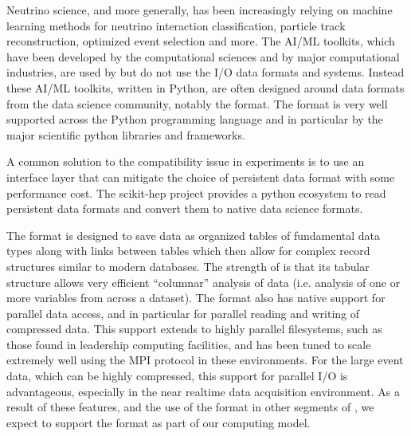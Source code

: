 \documentclass[../main-v1.tex]{subfiles}
\begin{document}
Neutrino science, and  more generally, has been increasingly relying on machine learning methods for neutrino interaction classification, particle track reconstruction, optimized event selection and more.  The AI/ML toolkits, which have been developed by the computational sciences and by major computational industries, are used by  but do not use 
the  I/O data formats and systems.
Instead these AI/ML toolkits, written in Python, are often designed around 
data formats from the data science community,
notably the  format.  The  format is very well supported across the Python programming language and in particular by the major scientific python libraries and frameworks.  

A common solution to the compatibility issue in  experiments is to use an interface layer that can mitigate the choice of persistent data format with some performance cost.  The scikit-hep project\cite{Rodrigues:2019nct} provides a python ecosystem to read  persistent data formats and convert them to native data science formats.

The  format is designed to save data as organized tables of fundamental data types along with links between tables which then allow for complex record structures similar to modern databases.  The strength of  is that its tabular structure allows very
efficient ``columnar'' analysis of data (i.e. analysis of one or more variables from across a dataset).
The format also has native support for parallel data access, and in particular for parallel reading and writing of compressed data.  This support extends to highly parallel filesystems, such as those found in leadership computing facilities, and has been tuned to scale extremely well using the MPI protocol in these environments.  
For the large  event data, which can be highly compressed, this support for parallel I/O is advantageous, especially in the near realtime data acquisition environment.  As a result of these features, and the use of the format in other segments of , we expect to support the  format as part of our computing model.
\end{document}
